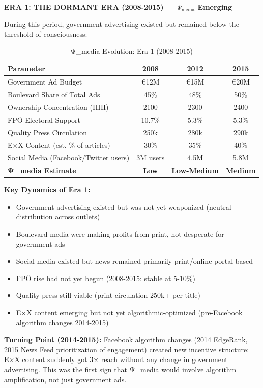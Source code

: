 \textbf{ERA 1: THE DORMANT ERA (2008-2015) — $\Psi_{\text{media}}$ Emerging}

During this period, government advertising existed but remained below the threshold of consciousness:

\begin{table}[h]
\centering
\caption{Ψ_media Evolution: Era 1 (2008-2015)}
\label{tab:dx-psi-evolution-era1}
\begin{tabular}{|l|c|c|c|}
\hline
\textbf{Parameter} & \textbf{2008} & \textbf{2012} & \textbf{2015} \\
\hline
Government Ad Budget & €12M & €15M & €20M & \\
Boulevard Share of Total Ads & 45\% & 48\% & 50\% \\
Ownership Concentration (HHI) & 2100 & 2300 & 2400 \\
FPÖ Electoral Support & 10.7\% & 5.3\% & 5.3\% \\
Quality Press Circulation & 250k & 280k & 290k \\
E×X Content (est. \% of articles) & 30\% & 35\% & 40\% \\
Social Media (Facebook/Twitter users) & 3M users & 4.5M & 5.8M \\
\hline
\textbf{Ψ_media Estimate} & \textbf{Low} & \textbf{Low-Medium} & \textbf{Medium} \\
\hline
\end{tabular}
\end{table}

\textbf{Key Dynamics of Era 1:}

\begin{itemize}
\item Government advertising existed but was not yet weaponized (neutral distribution across outlets)
\item Boulevard media were making profits from print, not desperate for government ads
\item Social media existed but news remained primarily print/online portal-based
\item FPÖ rise had not yet begun (2008-2015: stable at 5-10\%)
\item Quality press still viable (print circulation 250k+ per title)
\item E×X content emerging but not yet algorithmic-optimized (pre-Facebook algorithm changes 2014-2015)
\end{itemize}

\textbf{Turning Point (2014-2015):} Facebook algorithm changes (2014 EdgeRank, 2015 News Feed prioritization
of engagement) created new incentive structure: E×X content suddenly got 3× reach without any change in
government advertising. This was the first sign that Ψ_media would involve algorithm amplification, not
just government ads.

